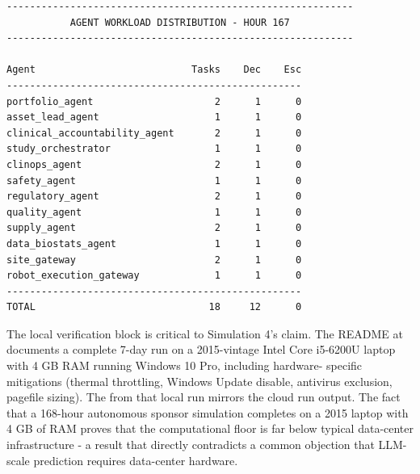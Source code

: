 \clearpage

\begin{verbatim}
------------------------------------------------------------
           AGENT WORKLOAD DISTRIBUTION - HOUR 167
------------------------------------------------------------

Agent                           Tasks    Dec    Esc
---------------------------------------------------
portfolio_agent                     2      1      0
asset_lead_agent                    1      1      0
clinical_accountability_agent       2      1      0
study_orchestrator                  1      1      0
clinops_agent                       2      1      0
safety_agent                        1      1      0
regulatory_agent                    2      1      0
quality_agent                       1      1      0
supply_agent                        2      1      0
data_biostats_agent                 1      1      0
site_gateway                        2      1      0
robot_execution_gateway             1      1      0
---------------------------------------------------
TOTAL                              18     12      0
\end{verbatim}

The local verification block is critical to Simulation 4's claim. The
README at
documents a complete 7-day run on a 2015-vintage Intel Core i5-6200U
laptop with 4 GB RAM running Windows 10 Pro, including hardware-
specific mitigations (thermal throttling, Windows Update disable,
antivirus exclusion, pagefile sizing). The
 from that local run mirrors the
cloud run output. The fact that a 168-hour autonomous sponsor
simulation completes on a 2015 laptop with 4 GB of RAM proves that
the computational floor is far below typical data-center
infrastructure - a result that directly contradicts a common
objection that LLM-scale prediction requires data-center hardware.

